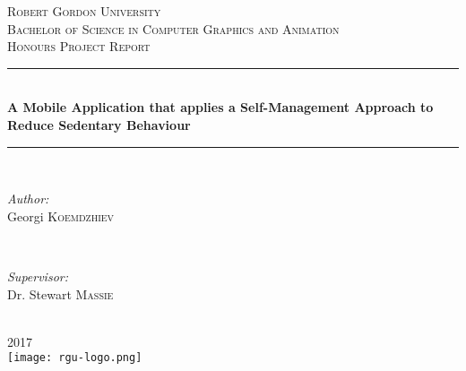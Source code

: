 \begin{titlepage}
  \newcommand{\HRule}{\rule{\linewidth}{0.5mm}}
  \center

  \textsc{\LARGE Robert Gordon University}\\[1.5cm]
  \textsc{\Large Bachelor of Science in Computer Graphics and Animation}\\[0.5cm]
  \textsc{\large Honours Project Report}\\[0.5cm]

  \HRule \\[0.4cm]
  { \huge \bfseries A Mobile Application that applies a Self-Management Approach to Reduce Sedentary Behaviour}\\[0.4cm]
  \HRule \\[1.5cm]

  \begin{minipage}{0.4\textwidth}
  \begin{flushleft} \large
  \emph{Author:}\\
  Georgi \textsc{Koemdzhiev}
  \end{flushleft}
  \end{minipage}
  ~
  \begin{minipage}{0.4\textwidth}
  \begin{flushright} \large
  \emph{Supervisor:} \\
  Dr. Stewart \textsc{Massie}
  \end{flushright}
  \end{minipage}\\[4cm]

  {\large 2017}\\[3cm]

  \texttt{[image: rgu-logo.png]}\\[1cm]
  \vfill
\end{titlepage}